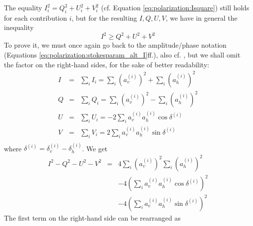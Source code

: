 The equality $I_i^2 = Q_i^2 + U_i^2 + V_i^2$
(cf. Equation \ref{eq:polarization:Isquare}) still holds for each
contribution $i$, but for the resulting $I,Q,U,V$, we have in general the
inequality
\begin{equation}
 \label{eq:polarization:stokes_inequality}
  I^2 \geq Q^2 + U^2 + V^2
\end{equation}
To prove it, we must once again go back to the amplitude/phase
notation (Equations \ref{eq:polarization:stokesparam_alt_I}ff.), also
cf. \citet[][chap. I.15]{chandrasekhar:60}, but we shall omit the
factor \half\InvImp{} on the right-hand sides, for the sake of better readability:
\begin{eqnarray}
I &=& \sum_i I_i = \sum_i \left(a_v^{(i)}\right)^2
                    + \sum_i \left(a_h^{(i)}\right)^2 \\
Q &=& \sum_i Q_i = \sum_i \left(a_v^{(i)}\right)^2
                    - \sum_i \left(a_h^{(i)}\right)^2 \\
U &=& \sum_i U_i = - 2 \sum_i a_v^{(i)} a_h^{(i)} \cos\delta^{(i)} \\
 V &=& \sum_i V_i = 2 \sum_i a_v^{(i)} a_h^{(i)} \sin\delta^{(i)} \\
\end{eqnarray}
where $\delta^{(i)} = \delta_v^{(i)} - \delta_h^{(i)}$. 
We get
\begin{eqnarray}
\label{eq:polarization:square-difference}  
I^2 - Q^2 - U^2 - V^2 &=& 
  4 \sum_i \left(a_v^{(i)}\right)^2
                     \sum_i \left(a_h^{(i)}\right)^2 \\ \nonumber
  &&- 4 \left( \sum_i a_v^{(i)} a_h^{(i)} \cos\delta^{(i)} \right)^2
  \\ \nonumber
  &&- 4 \left( \sum_i a_v^{(i)} a_h^{(i)} \sin\delta^{(i)} \right)^2 
\end{eqnarray}
The first term on the right-hand side can be rearranged as
